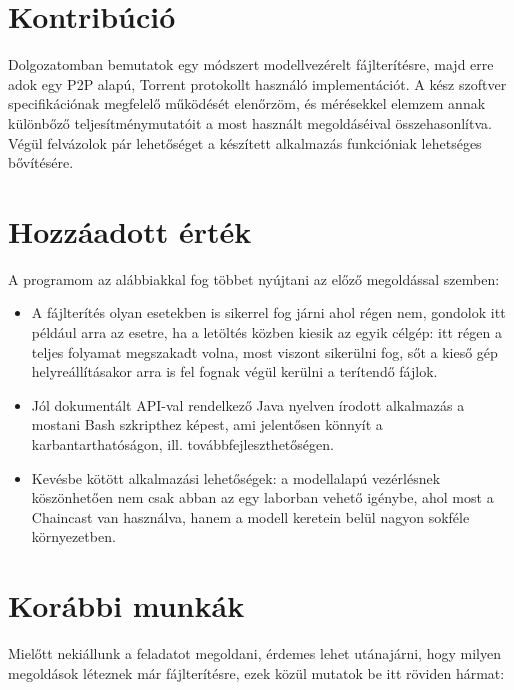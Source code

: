 \section{Kontribúció}
Dolgozatomban bemutatok egy módszert modellvezérelt fájlterítésre, majd erre adok egy P2P alapú, Torrent protokollt használó implementációt. A kész szoftver specifikációnak megfelelő működését elenőrzöm, és mérésekkel elemzem annak különbőző teljesítménymutatóit a most használt megoldáséival összehasonlítva. Végül felvázolok pár lehetőséget a készített alkalmazás funkcióniak lehetséges bővítésére.

\section{Hozzáadott érték}
A programom az alábbiakkal fog többet nyújtani az előző megoldással szemben:

\begin{itemize}
  \item A fájlterítés olyan esetekben is sikerrel fog járni ahol régen nem, gondolok itt például arra az esetre, ha a letöltés közben kiesik az egyik célgép: itt régen a teljes folyamat megszakadt volna, most viszont sikerülni fog, sőt a kieső gép helyreállításakor arra is fel fognak végül kerülni a terítendő fájlok.
  \item Jól dokumentált API-val rendelkező Java nyelven írodott alkalmazás a mostani Bash szkripthez képest, ami jelentősen könnyít a karbantarthatóságon, ill. továbbfejleszthetőségen.
  \item Kevésbe kötött alkalmazási lehetőségek: a modellalapú vezérlésnek köszönhetően nem csak abban az egy laborban vehető igénybe, ahol most a Chaincast van használva, hanem a modell keretein belül nagyon sokféle környezetben.
\end{itemize}

\section{Korábbi munkák}
Mielőtt nekiállunk a feladatot megoldani, érdemes lehet utánajárni, hogy milyen megoldások léteznek már fájlterítésre, ezek közül mutatok be itt röviden hármat:

